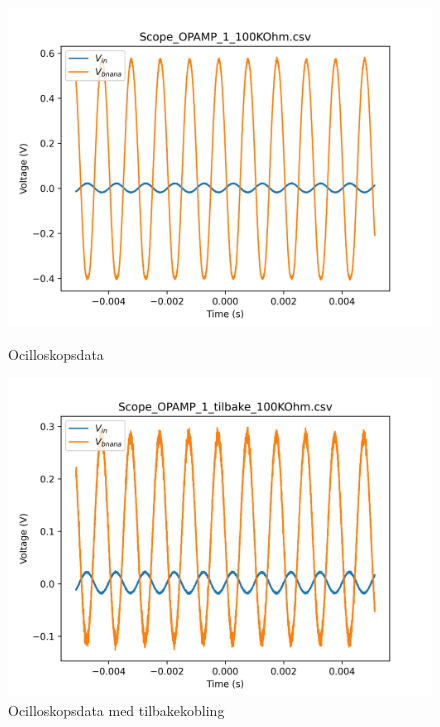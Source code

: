\begin{figure}
    \begin{minipage}[c]{0.5\textwidth}
        \centering
        \includegraphics[width=1\textwidth]{Bilder/Scope_OPAMP_1_100KOhm.png}
        \caption{Ocilloskopsdata}
        \label{fig:ocilloskop_data}
    \end{minipage}
    \begin{minipage}[c]{0.5\textwidth}
        \centering
        \includegraphics[width=1\textwidth]{Bilder/Scope_OPAMP_1_tilbake_100KOhm.png}
        \caption{Ocilloskopsdata med tilbakekobling}
        \label{fig:ocilloskop_data_tilbake}
    \end{minipage}
\end{figure}

